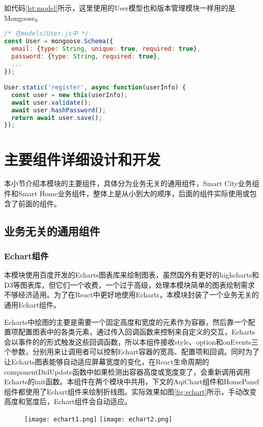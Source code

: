 如代码\ref{lst:model}所示，这里使用的User模型也和版本管理模块一样用的是Mongoose。
\begin{lstlisting}[language={JavaScript}, label={lst:model}, caption={Smart City和Smart Home模块后端User模型}]
/* 在models/User.js中 */
const User = mongoose.Schema({
  email: {type: String, unique: true, required: true},
  password: {type: String, required: true},
  ...
});

User.static('register', async function(userInfo) {
  const user = new this(userInfo);
  await user.validate();
  await user.hashPassword();
  return await user.save();
});
\end{lstlisting}

\section{主要组件详细设计和开发}
本小节介绍本模块的主要组件，具体分为业务无关的通用组件，Smart City业务组件和Smart Home业务组件，整体上是从小到大的顺序，后面的组件实际使用或包含了前面的组件。
\subsection{业务无关的通用组件}
\subsubsection{Echart组件}
本模块使用百度开发的Echarts图表库来绘制图表，虽然国外有更好的highcharts和D3等图表库，但它们一个收费，一个过于高级，处理本模块简单的图表绘制需求不够经济适用。为了在React中更好地使用Echarts，本模块封装了一个业务无关的通用Echart组件。

Echarts中绘图的主要是需要一个固定高度和宽度的元素作为容器，然后靠一个配置项配置图表中的各类元素，通过传入回调函数来控制来自定义的交互，Echarts会以事件的的形式触发这些回调函数，所以本组件接收style、option和onEvents三个参数，分别用来让调用者可以控制Echart容器的宽高、配置项和回调。同时为了让Echarts图表能够自动适应屏幕宽度的变化，在React生命周期的componentDidUpdate函数中如果检测出容器高度或宽度变了，会重新调用调用Echarts的init函数。本组件在两个模块中共用，下文的AqiChart组件和HomePanel组件都使用了Echart组件来绘制折线图。实际效果如图\ref{fig:echart}所示，手动改变高度和宽度后，Echart组件会自动适应。
\begin{figure}[!htp]
 \centering
 \texttt{[image: echart1.png]}
 \texttt{[image: echart2.png]}
\end{figure}
